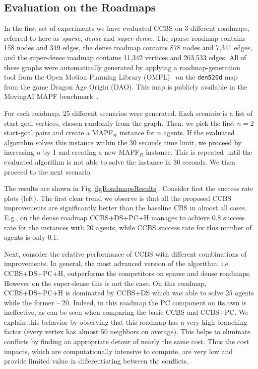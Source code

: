 \documentclass[letterpaper]{article} %
\newcommand{\cbs}{\ac{CBS}\xspace}
\newcommand{\ccbs}{\ac{CCBS}\xspace}
\newcommand{\mapfr}{{MAPF}$_R$\xspace}
\newcommand{\mapf}{\ac{MAPF}\xspace}
\newcommand{\pc}{\ac{PC}\xspace}
\newcommand{\ds}{\ac{DS}\xspace}
\begin{document}
\subsection{Evaluation on the Roadmaps}

In the first set of experiments we have evaluated \ccbs on 3 different roadmaps, referred to here as \emph{sparse}, \emph{dense} and \emph{super-dense}. The sparse roadmap contains 158 nodes and 349 edges, the dense roadmap contains 878 nodes and 7,341 edges, and the super-dense roadmap contains 11,342 vertices and 263,533 edges. All of these graphs were automatically generated by applying a roadmap-generation tool from the Open Motion Planning Library (OMPL)~\cite{sucan2012ompl} on the \texttt{den520d} map from the game Dragon Age Origin (DAO). This map is publicly available in the MovingAI \mapf benchmark~\cite{stern2019multi}. 

For each roadmap, 25 different scenarios were generated. Each scenario is a list of start-goal vertices, chosen randomly from the graph. 
Then, we pick the first $n=2$ start-goal pairs and create a \mapfr instance for $n$ agents. If the evaluated algorithm solves this instance within the 30 seconds time limit, we proceed by increasing $n$ by 1 and creating a new \mapfr instance. 
This is repeated until the evaluated algorithm is not able to solve the instance in 30 seconds. We then proceed to the next scenario. 

The results are shown in Fig.\ref{figRoadmapsResults}. Consider first the success rate plots (left). The first clear trend we observe is that all the proposed \ccbs improvements are significantly better than the baseline \cbs in almost all cases. 
E.g., on the dense roadmap \ccbs+\ds+\pc+H manages to achieve 0.8 success rate for the instances with 20 agents, while \ccbs success rate for this number of agents is only 0.1. 


Next, consider the relative performance of \ccbs with different combinations of improvements. In general, the most advanced version of the algorithm, i.e. \ccbs+\ds+\pc+H, outperforms the competitors on sparse and dense roadmaps. 
However on the super-dense this is not the case. On this roadmap, \ccbs+\ds+\pc+H is dominated by \ccbs+\ds which was able to solve 25 agents while the former -- 20. 
Indeed, in this roadmap the \pc component on its own is ineffective, as can be seen when comparing the basic \ccbs and \ccbs+\pc. 
We explain this behavior by observing that this roadmap has a very high branching factor (every vertex has almost 50 neighbors on average). 
This helps to eliminate conflicts by finding an appropriate detour of nearly the same cost. Thus the cost impacts, which are computationally intensive to compute, are very low and provide limited value in differentiating between the conflicts. 
\end{document}
